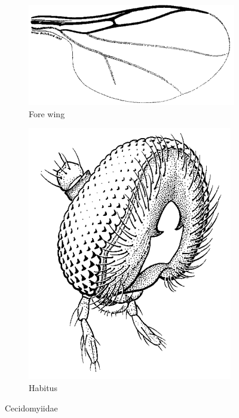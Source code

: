 \documentclass[letterpaper, 11pt]{article}
\begin{document}
\begin{figure}[ht!]
    \centering
    \begin{subfigure}[ht!]{0.45\textwidth}
        \includegraphics[width=\textwidth]{CecidomyiidWing}
        \caption{Fore wing \citep[][Fig. 16.13]{mcalpine1981manual}}
        \label{fig:cecidomyiid1}
    \end{subfigure}
    \qquad
    \begin{subfigure}[ht!]{0.25\textwidth}
        \includegraphics[width=\textwidth]{CecidomyiidHead}
        \caption{Habitus \citep[][Fig. 16.2]{mcalpine1981manual}}
        \label{fig:cecidomyiid2}
    \end{subfigure}
    \caption{Cecidomyiidae}\label{fig:cecidomyiids}
\end{figure}
\end{document}
